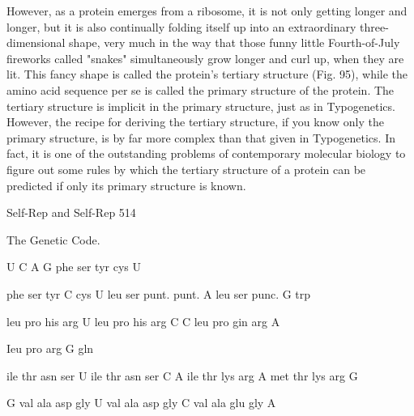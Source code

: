 { However, as a protein emerges from a ribosome, it is not only getting longer and longer, but
it is also continually folding itself up into an extraordinary three-dimensional shape, very
much in the way that those funny little Fourth-of-July fireworks called "snakes"
simultaneously grow longer and curl up, when they are lit. This fancy shape is called the
protein's tertiary structure (Fig. 95), while the amino acid sequence per se is called the
primary structure of the protein. The tertiary structure is implicit in the primary structure, just
as in Typogenetics. However, the recipe for deriving the tertiary structure, if you know only
the primary structure, is by far more complex than that given in Typogenetics. In fact, it is
one of the outstanding problems of contemporary molecular biology to figure out some rules
by which the tertiary structure of a protein can be predicted if only its primary structure is
known.




Self-Rep and Self-Rep                                                                          514

The Genetic Code.


                              U   C       A        G
                      phe         ser   tyr     cys          U

                      phe         ser   tyr                  C
                                                cys
              U         leu       ser   punt.   punt.        A
                        leu       ser   punc.                G
                                                 trp


                        leu       pro   his      arg         U
                        leu       pro   his      arg         C
              C         leu       pro   gin      arg         A

                        Ieu       pro            arg         G
                                        gln


                        ile       thr   asn      ser         U
                        ile       thr   asn      ser         C
              A         ile       thr   lys      arg         A
                      met         thr   lys      arg         G


              G         val       ala   asp     gly          U
                        val       ala   asp     gly          C
                        val       ala   glu     gly          A

}
